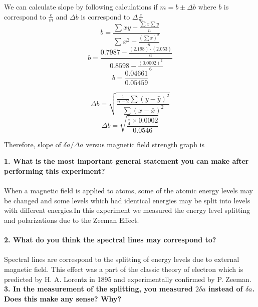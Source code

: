 \documentclass[a4paper,12pt]{article}
\begin{document}
We can calculate slope by following calculations if $m=b \pm \Delta b$ where $b$ is correspond to $\frac{e}{m}$ and $\Delta b$ is correspond to $\Delta \frac{e}{m}$
\begin{equation}
b=\frac{\sum xy - \frac{\sum x \sum y}{n}}{\sum x^{2} - \frac{(\sum x )^{2}}{n}}
\end{equation}
\begin{equation}
b=\frac{0.7987 - \frac{(2.198)\cdot(2.053)}{6}}{0.8598 - \frac{(0.0002)^{2}}{6}}
\end{equation}
\begin{equation}
b=\frac{0.04661}{0.05459}
\end{equation}
\begin{center}
\end{center}
\begin{equation}
\Delta b = \sqrt{\frac{\frac{1}{n-2}\sum (y-\hat{y})^{2}}{\sum (x-\bar{x})^{2}}}
\end{equation}
\begin{equation}
\Delta b = \sqrt{\frac{\frac{1}{4}\times 0.0002}{0.0546}}
\end{equation}
\begin{center}
\end{center}
Therefore, slope of $\delta a /\Delta a$ versus magnetic field strength graph is
\begin{center}
\end{center}
\textbf{1. What is the most important general statement you can make after performing this experiment?}\\\\
When a magnetic field is applied to atoms, some of the atomic
energy levels may be changed and some levels which had identical
energies may be split into levels with different energies.In this experiment we measured the energy level splitting and
polarizations due to the Zeeman Effect.\\\\
\textbf{2. What do you think the spectral lines may correspond to?}\\\\
Spectral lines are correspond to the splitting of energy levels due to external magnetic field. This effect was a part of the classic theory of electron which is predicted by H. A. Lorentz in 1895 and experimentally confirmed by P. Zeeman.
\newpage
\textbf{3. In the measurement of the splitting, you measured $2\delta a $ instead of $\delta a $. Does this make any sense? Why?}\\\\
\end{document}
